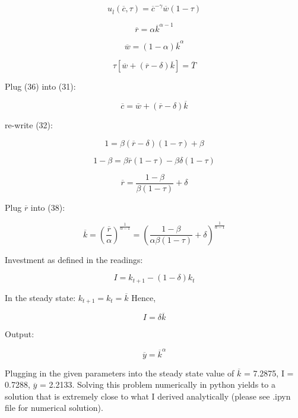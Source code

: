 \documentclass[letterpaper,12pt]{article}
\theoremstyle{definition}
\begin{document}
\begin{equation}
  u_{\overline{l}}(\overline{c}, \tau)=\overline{c}^{-\gamma} \overline{w}(1-\tau)
\end{equation}

\begin{equation}
  \overline{r}=\alpha \overline{k}^{\alpha-1}
\end{equation}

\begin{equation}
  \overline{w}=(1-\alpha) \overline{k}^{\alpha}
\end{equation}

\begin{equation}\label{ref1}
  \tau[\overline{w}+(\overline{r}-\delta) \overline{k}]=\overline{T}
\end{equation}

Plug (36) into (31):

\begin{equation}
  \overline{c}=\overline{w}+(\overline{r}-\delta) \overline{k}
\end{equation}

re-write (32):

$$1=\beta(\overline{r}-\delta)(1-\tau)+\beta$$

$$1-\beta=\beta \overline{r}(1-\tau)-\beta \delta(1-\tau)$$

\begin{equation}\label{r}
  \overline{r}=\frac{1-\beta}{\beta(1-\tau)}+\delta
\end{equation}

Plug $\overline{r}$ into (38):

\begin{equation}
  \overline{k}=\left(\frac{\overline{r}}{\alpha}\right)^{\frac{1}{\alpha-1}}=\left(\frac{1-\beta}{\alpha \beta(1-\tau)}+\delta\right)^{\frac{1}{\alpha-1}}
\end{equation}

Investment as defined in the readings:

$$I=k_{t+1}-(1-\delta) k_{t}$$

In the steady state: $k_{t+1}=k_{t}=\overline{k}$
Hence,

$$I=\delta \overline{k}$$

Output:

$$\overline{y}=\overline{k}^{\alpha}$$

Plugging in the given parameters into the steady state value of $\overline{k}$ = 7.2875, I = 0.7288, $\overline{y}$ = 2.2133. Solving this problem numerically in python yields to a solution that is extremely close to what I derived analytically (please see .ipyn file for numerical solution).
\end{document}
